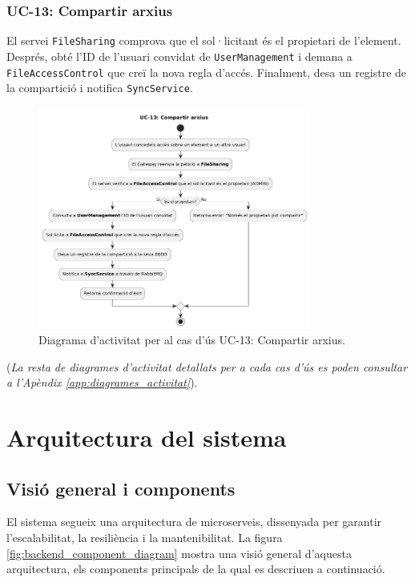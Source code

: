 \subsubsection{UC-13: Compartir arxius}
El servei \texttt{FileSharing} comprova que el sol·licitant és el propietari de l'element. Després, obté l'ID de l'usuari convidat de \texttt{UserManagement} i demana a \texttt{FileAccessControl} que creï la nova regla d'accés. Finalment, desa un registre de la compartició i notifica \texttt{SyncService}.

\begin{figure}[H]
    \centering
    \includegraphics[width=0.8\textwidth]{Figures/ad_UC13.png}
    \caption{Diagrama d'activitat per al cas d'ús UC-13: Compartir arxius.}
    \label{fig:ad_uc13}
\end{figure}

\par\noindent(\emph{La resta de diagrames d'activitat detallats per a cada cas d'ús es poden consultar a l'Apèndix \ref{app:diagrames_activitat}}).

\section{Arquitectura del sistema}

\subsection{Visi\'o general i components}
El sistema segueix una arquitectura de microserveis, dissenyada per garantir l'escalabilitat, la resiliència i la mantenibilitat. La figura \ref{fig:backend_component_diagram} mostra una visió general d'aquesta arquitectura, els components principals de la qual es descriuen a continuació.

